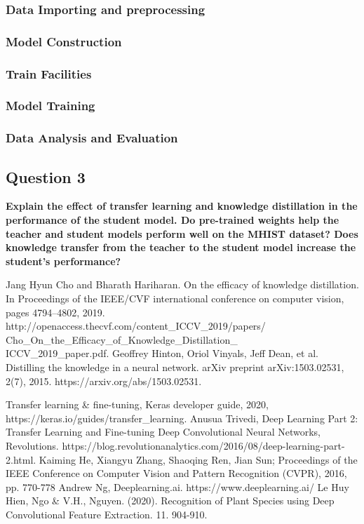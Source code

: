 \documentclass[conference]{IEEEtran}
\begin{document}
\subsubsection{Data Importing and preprocessing}

\subsubsection{Model Construction}

\subsubsection{Train Facilities}

\subsubsection{Model Training}

\subsubsection{Data Analysis and Evaluation}

\subsection{Question 3} \textbf{Explain the effect of transfer learning and knowledge distillation in the performance of the student model. Do pre-trained weights help the teacher and student models perform well on the MHIST dataset? Does knowledge transfer from the teacher to the student model increase the student’s performance?}

\begin{thebibliography}{00}


 Jang Hyun Cho and Bharath Hariharan. On the efficacy of knowledge distillation. In Proceedings of the IEEE/CVF international conference on computer vision, pages 4794–4802, 2019. http://openaccess.thecvf.com/content\_ICCV\_2019/papers/\\Cho\_On\_the\_Efficacy\_of\_Knowledge\_Distillation\_\\ICCV\_2019\_paper.pdf.
 Geoffrey Hinton, Oriol Vinyals, Jeff Dean, et al. Distilling the knowledge in a neural network. arXiv preprint arXiv:1503.02531, 2(7), 2015. https://arxiv.org/abs/1503.02531.


 Transfer learning \& fine-tuning, Keras developer guide, 2020, https://keras.io/guides/transfer\_learning.
 Anusua Trivedi, Deep Learning Part 2: Transfer Learning and Fine-tuning Deep Convolutional Neural Networks, Revolutions. https://blog.revolutionanalytics.com/2016/08/deep-learning-part-2.html.
 Kaiming He, Xiangyu Zhang, Shaoqing Ren, Jian Sun; Proceedings of the IEEE Conference on Computer Vision and Pattern Recognition (CVPR), 2016, pp. 770-778
 Andrew Ng, Deeplearning.ai. https://www.deeplearning.ai/
Le Huy Hien, Ngo & V.H., Nguyen. (2020). Recognition of Plant Species using Deep Convolutional Feature Extraction. 11. 904-910. 
\end{thebibliography}
\end{document}
